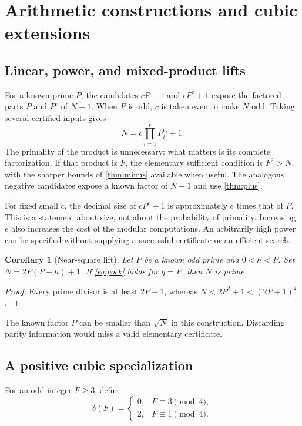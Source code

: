 \documentclass[11pt,a4paper]{article}
\newtheorem{corollary}[theorem]{Corollary}
\theoremstyle{definition}\newtheorem{definition}[theorem]{Definition}
\theoremstyle{remark}\newtheorem{remark}[theorem]{Remark}
\begin{document}
\section{Arithmetic constructions and cubic extensions}
\label{sec:arithmetic}

\subsection{Linear, power, and mixed-product lifts}

For a known prime $P$, the candidates $cP+1$ and $cP^e+1$ expose the factored
parts $P$ and $P^e$ of $N-1$. When $P$ is odd, $c$ is taken even to make $N$
odd. Taking several certified inputs gives
\[
 N=c\prod_{i=1}^rP_i^{e_i}+1.
\]
The primality of the product is unnecessary: what matters is its complete
factorization. If that product is $F$, the elementary sufficient condition is
$F^2>N$, with the sharper bounds of \cref{thm:minus} available when useful.
The analogous negative candidates expose a known factor of $N+1$ and use
\cref{thm:plus}.

For fixed small $c$, the decimal size of $cP^e+1$ is approximately $e$ times
that of $P$. This is a statement about size, not about the probability of
primality. Increasing $e$ also increases the cost of the modular computations.
An arbitrarily high power can be specified without supplying a successful
certificate or an efficient search.

\begin{corollary}[Near-square lift]\label{cor:near}
Let $P$ be a known odd prime and $0<h<P$. Set $N=2P(P-h)+1$. If
\eqref{eq:pock} holds for $q=P$, then $N$ is prime.
\end{corollary}
\begin{proof}
Every prime divisor is at least $2P+1$, whereas
$N<2P^2+1<(2P+1)^2$.
\end{proof}

The known factor $P$ can be smaller than $\sqrt N$ in this construction.
Discarding parity information would miss a valid elementary certificate.

\subsection{A positive cubic specialization}

For an odd integer $F\ge3$, define
\begin{equation}\label{eq:delta}
 \delta(F)=\begin{cases}0,&F\equiv3\pmod4,\\2,&F\equiv1\pmod4.\end{cases}
\end{equation}
\end{document}
